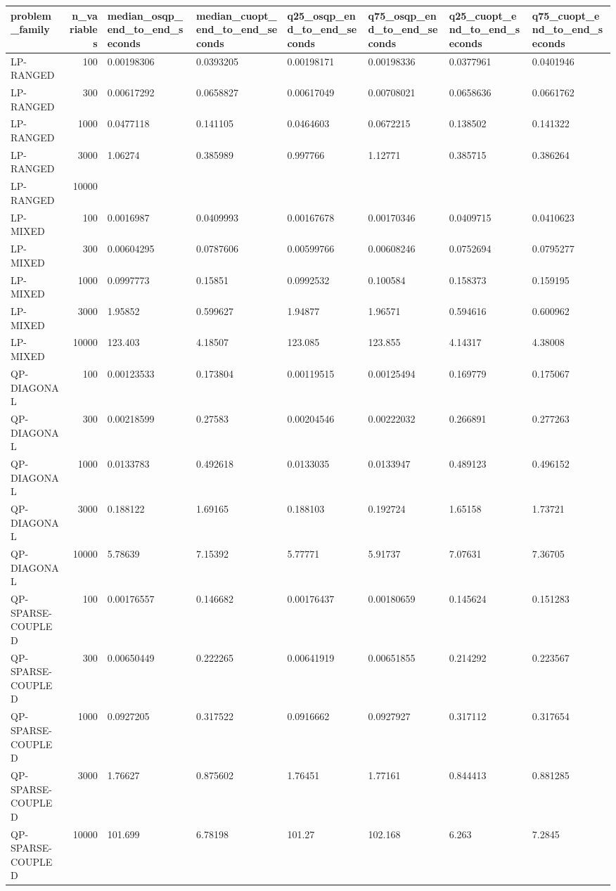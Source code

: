 \begin{table}
\label{tab:end-to-end-time}
\begin{tabular}{lrllllll}
\toprule
problem\_family & n\_variables & median\_osqp\_end\_to\_end\_seconds & median\_cuopt\_end\_to\_end\_seconds & q25\_osqp\_end\_to\_end\_seconds & q75\_osqp\_end\_to\_end\_seconds & q25\_cuopt\_end\_to\_end\_seconds & q75\_cuopt\_end\_to\_end\_seconds \\
\midrule
LP-RANGED & 100 & 0.00198306 & 0.0393205 & 0.00198171 & 0.00198336 & 0.0377961 & 0.0401946 \\
LP-RANGED & 300 & 0.00617292 & 0.0658827 & 0.00617049 & 0.00708021 & 0.0658636 & 0.0661762 \\
LP-RANGED & 1000 & 0.0477118 & 0.141105 & 0.0464603 & 0.0672215 & 0.138502 & 0.141322 \\
LP-RANGED & 3000 & 1.06274 & 0.385989 & 0.997766 & 1.12771 & 0.385715 & 0.386264 \\
LP-RANGED & 10000 &  &  &  &  &  &  \\
LP-MIXED & 100 & 0.0016987 & 0.0409993 & 0.00167678 & 0.00170346 & 0.0409715 & 0.0410623 \\
LP-MIXED & 300 & 0.00604295 & 0.0787606 & 0.00599766 & 0.00608246 & 0.0752694 & 0.0795277 \\
LP-MIXED & 1000 & 0.0997773 & 0.15851 & 0.0992532 & 0.100584 & 0.158373 & 0.159195 \\
LP-MIXED & 3000 & 1.95852 & 0.599627 & 1.94877 & 1.96571 & 0.594616 & 0.600962 \\
LP-MIXED & 10000 & 123.403 & 4.18507 & 123.085 & 123.855 & 4.14317 & 4.38008 \\
QP-DIAGONAL & 100 & 0.00123533 & 0.173804 & 0.00119515 & 0.00125494 & 0.169779 & 0.175067 \\
QP-DIAGONAL & 300 & 0.00218599 & 0.27583 & 0.00204546 & 0.00222032 & 0.266891 & 0.277263 \\
QP-DIAGONAL & 1000 & 0.0133783 & 0.492618 & 0.0133035 & 0.0133947 & 0.489123 & 0.496152 \\
QP-DIAGONAL & 3000 & 0.188122 & 1.69165 & 0.188103 & 0.192724 & 1.65158 & 1.73721 \\
QP-DIAGONAL & 10000 & 5.78639 & 7.15392 & 5.77771 & 5.91737 & 7.07631 & 7.36705 \\
QP-SPARSE-COUPLED & 100 & 0.00176557 & 0.146682 & 0.00176437 & 0.00180659 & 0.145624 & 0.151283 \\
QP-SPARSE-COUPLED & 300 & 0.00650449 & 0.222265 & 0.00641919 & 0.00651855 & 0.214292 & 0.223567 \\
QP-SPARSE-COUPLED & 1000 & 0.0927205 & 0.317522 & 0.0916662 & 0.0927927 & 0.317112 & 0.317654 \\
QP-SPARSE-COUPLED & 3000 & 1.76627 & 0.875602 & 1.76451 & 1.77161 & 0.844413 & 0.881285 \\
QP-SPARSE-COUPLED & 10000 & 101.699 & 6.78198 & 101.27 & 102.168 & 6.263 & 7.2845 \\
\bottomrule
\end{tabular}
\end{table}

